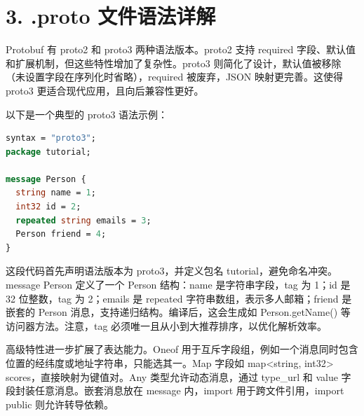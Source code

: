 \chapter{3. .proto 文件语法详解}
Protobuf 有 proto2 和 proto3 两种语法版本。proto2 支持 required 字段、默认值和扩展机制，但这些特性增加了复杂性。proto3 则简化了设计，默认值被移除（未设置字段在序列化时省略），required 被废弃，JSON 映射更完善。这使得 proto3 更适合现代应用，且向后兼容性更好。\par
以下是一个典型的 proto3 语法示例：\par
\begin{lstlisting}[language=proto]
syntax = "proto3";
package tutorial;

message Person {
  string name = 1;
  int32 id = 2;
  repeated string emails = 3;
  Person friend = 4;
}
\end{lstlisting}
这段代码首先声明语法版本为 proto3，并定义包名 tutorial，避免命名冲突。message Person 定义了一个 Person 结构：name 是字符串字段，tag 为 1；id 是 32 位整数，tag 为 2；emails 是 repeated 字符串数组，表示多人邮箱；friend 是嵌套的 Person 消息，支持递归结构。编译后，这会生成如 Person.getName() 等访问器方法。注意，tag 必须唯一且从小到大推荐排序，以优化解析效率。\par
高级特性进一步扩展了表达能力。Oneof 用于互斥字段组，例如一个消息同时包含位置的经纬度或地址字符串，只能选其一。Map 字段如 map<string, int32> scores，直接映射为键值对。Any 类型允许动态消息，通过 type\_{}url 和 value 字段封装任意消息。嵌套消息放在 message 内，import 用于跨文件引用，import public 则允许转导依赖。\par
